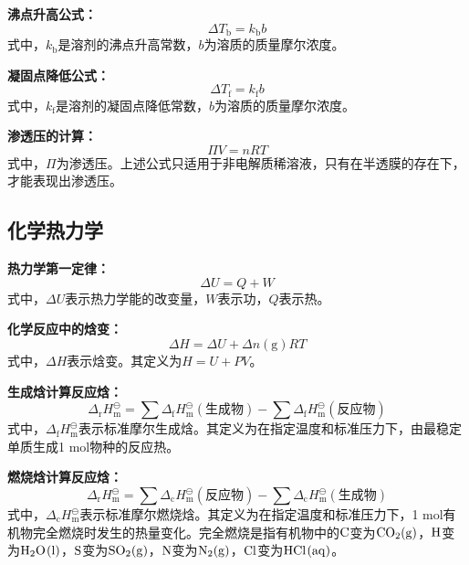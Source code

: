 \documentclass[
  10pt,
  twoside,
  openany,
  b5paper, %
  colorscheme = basic, %
  xits = false,
]{qyxf-book}
\begin{document}
\textbf{沸点升高公式：}
	\begin{equation*}
		\Delta T_\mathrm{b} = k_\mathrm{b} b 
	\end{equation*}
式中，$k_\mathrm{b}$是溶剂的沸点升高常数，$b$为溶质的质量摩尔浓度。

\textbf{凝固点降低公式：}
	\begin{equation*}
		\Delta T_\mathrm{f} = k_\mathrm{f} b 
	\end{equation*}
式中，$k_\mathrm{f}$是溶剂的凝固点降低常数，$b$为溶质的质量摩尔浓度。

\textbf{渗透压的计算：}
	\begin{equation*}
		\varPi V = nRT
	\end{equation*}
式中，$\varPi$为渗透压。上述公式只适用于非电解质稀溶液，只有在半透膜的存在下，才能表现出渗透压。

\subsection{化学热力学}


\textbf{热力学第一定律：}
	\begin{equation*}
		\Delta U = Q + W 
	\end{equation*}
式中，$\Delta U$表示热力学能的改变量，$W$表示功，$Q$表示热。

\textbf{化学反应中的焓变：}
	\begin{equation*}
		\Delta H = \Delta U + \Delta n(\mathrm{g})RT
	\end{equation*}
式中，$\Delta H$表示焓变。其定义为$H=U+PV$。

\textbf{生成焓计算反应焓：}
	\begin{equation*}
		\Delta_\mathrm{r}H^\ominus_\mathrm{m} = \sum \Delta_\mathrm{f}H^\ominus_\mathrm{m}(\text{生成物}) - \sum \Delta_\mathrm{f}H^\ominus_\mathrm{m}(\text{反应物}) 
	\end{equation*}
式中，$\Delta_\mathrm{f}H^\ominus_\mathrm{m}$表示标准摩尔生成焓。其定义为在指定温度和标准压力下，由最稳定单质生成1 mol物种的反应热。

\textbf{燃烧焓计算反应焓：}
	\begin{equation*}
		\Delta_\mathrm{r}H^\ominus_\mathrm{m} = \sum 	\Delta_\mathrm{c}H^\ominus_\mathrm{m}(\text{反应物}) - \sum \Delta_\mathrm{c}H^\ominus_\mathrm{m}(\text{生成物}) 
	\end{equation*}
式中，$\Delta_\mathrm{c}H^\ominus_\mathrm{m}$表示标准摩尔燃烧焓。其定义为在指定温度和标准压力下，1 mol有机物完全燃烧时发生的热量变化。完全燃烧是指有机物中的$\ce{C}$变为$\ce{CO2(g)}$，$\ce{H}$变为$\ce{H2O(l)}$，$\ce{S}$变为$\ce{SO2(g)}$，$\ce{N}$变为$\ce{N2(g)}$，$\ce{Cl}$变为$\ce{HCl(aq)}$。
\end{document}
